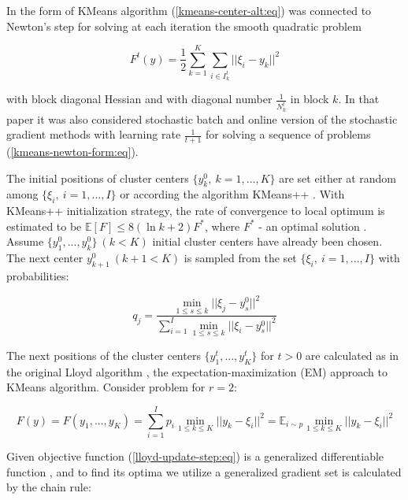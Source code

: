 In \cite{Bottou_1994} the form of KMeans algorithm (\ref{kmeans-center-alt:eq}) was connected to Newton's step for solving at each iteration the smooth quadratic problem

\begin{equation}
    \label{kmeans-newton-form:eq}
        F^t(y) = \frac{1}{2} \sum_{k=1}^K \sum_{i \in I_k^t} || \xi_i - y_k ||^2
\end{equation}

\noindent with block diagonal Hessian and with diagonal number $ \frac{1}{N_k^t} $ in block $ k $. In that paper it was also considered stochastic batch and online version of the stochastic gradient methods with learning rate $ \frac{1}{t + 1} $ for solving a sequence of problems (\ref{kmeans-newton-form:eq}).

The initial positions of cluster centers $ \{ y_k^0, \> k = 1, ..., K \} $ are set either at random among $ \{ \xi_i, \> i = 1, ..., I \} $ or according the algorithm KMeans++ \cite{Arthur_Vassilvitskii_2007,Nguyen_Duong_2018}. With KMeans++ initialization strategy, the rate of convergence to local optimum is estimated to be $ \mathbb{E} [F] \leq 8(\ln k + 2 ) F^{*} $, where $ F^{*} $ - an optimal solution \cite{Arthur_Vassilvitskii_2007}. Assume $ \{ y_1^0, ..., y_k^0 \} \> (k<K) $ initial cluster centers have already been chosen. The next center $ y_{k+1}^0 \> (k+1<K) $ is sampled from the set $ \{ \xi_i, \> i = 1, ..., I \} $ with probabilities:

\begin{equation}
    \label{kmeans-plus-plus-init:eq}
        q_j = \frac{\min_{1 \leq s \leq k} || \xi_j - y_s^0 ||^2}{\sum_{i=1}^I \min_{1 \leq s \leq k} || \xi_i - y_s^0 ||^2}
\end{equation}

The next positions of the cluster centers $ \{ y_1^t, ..., y_K^t \} $ for $ t > 0 $ are calculated as in the original Lloyd algorithm \cite{Lloyd_1982}, the expectation-maximization (EM) approach to KMeans algorithm. Consider problem for $ r = 2 $: 

\begin{equation}
    \label{lloyd-update-step:eq}
        F(y) = F(y_1, ..., y_K) = \sum_{i=1}^I p_i \min_{1 \leq k \leq K} || y_k - \xi_i ||^2 = \mathbb{E}_{i \sim p} \min_{1 \leq k \leq K} || y_k - \xi_i ||^2
\end{equation}

Given objective function (\ref{lloyd-update-step:eq}) is a generalized differentiable function \cite{Norkin_1986}, and to find its optima we utilize a generalized gradient set is calculated by the chain rule:

